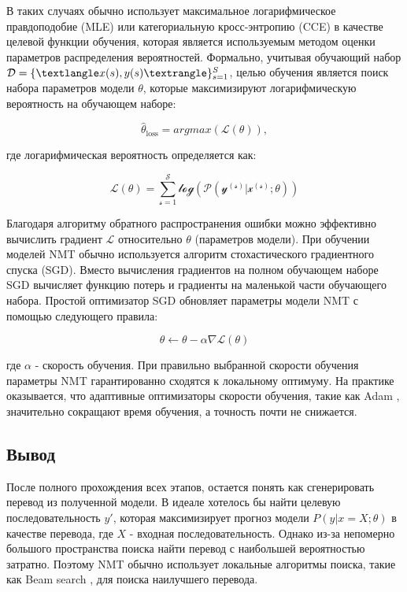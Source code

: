 	В таких случаях обычно использует максимальное логарифмическое правдоподобие (MLE) или категориальную кросс-энтропию (CCE) в качестве целевой функции обучения, которая является используемым методом оценки параметров распределения вероятностей. Формально, учитывая обучающий набор $ \mathcal{D} = \{\textlangle x(s), y(s) \textrangle\}_{s=1}^S $, целью обучения является поиск набора параметров модели $\theta$, которые максимизируют логарифмическую вероятность на обучающем наборе:
	
	$$
	    \hat{\theta}_{\text{loss}} = argmax(\mathscr{L}(\theta)),
	$$

    где логарифмическая вероятность определяется как:
    
    $$
      \mathscr{L(\theta)=\sum_{s=1}^S log(P(y^{(s)}|x^{(s)};\theta))}  
    $$
    
    Благодаря алгоритму обратного распространения ошибки можно эффективно вычислить градиент $\mathscr{L}$ относительно $\theta$ (параметров модели). При обучении моделей NMT обычно используется алгоритм стохастического градиентного спуска (SGD). Вместо вычисления градиентов на полном обучающем наборе SGD вычисляет функцию потерь и градиенты на маленькой части обучающего набора. Простой оптимизатор SGD обновляет параметры модели NMT с помощью следующего правила:
    
    $$
        \theta \leftarrow \theta - \alpha \nabla \mathscr{L}(\theta)
    $$
    
    где $\alpha$ - скорость обучения. При правильно выбранной скорости обучения параметры NMT гарантированно сходятся к локальному оптимуму. На практике оказывается, что адаптивные оптимизаторы скорости обучения, такие как Adam \cite{14}, значительно сокращают время обучения, а точность почти не снижается.
    
	\subsection{Вывод}
	
	После полного прохождения всех этапов, остается понять как сгенерировать перевод из полученной модели. В идеале хотелось бы найти целевую последовательность $y'$, которая максимизирует прогноз модели $P(y|x=X;\theta)$ в качестве перевода, где $X$ - входная последовательность. Однако из-за непомерно большого пространства поиска найти перевод с наибольшей вероятностью затратно. Поэтому NMT обычно использует локальные алгоритмы поиска, такие как Beam search \cite{8}, для поиска наилучшего перевода.
	
